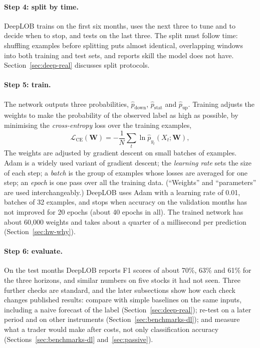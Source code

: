 \paragraph{Step 4: split by time.} DeepLOB trains on the first six months, uses the next three to tune and to decide
when to stop, and tests on the last three. The split must follow time: shuffling examples before splitting puts
almost identical, overlapping windows into both training and test sets, and reports skill the model does not have.
Section~\ref{sec:deep-real} discusses split protocols.

\paragraph{Step 5: train.} The network outputs three probabilities, $\hat p_{\text{down}}$, $\hat p_{\text{stat}}$ and
$\hat p_{\text{up}}$. Training adjusts the weights to make the probability of the observed label as high as
possible, by minimising the \emph{cross-entropy} loss over the training examples,
\begin{equation}
\mathcal{L}_{\text{CE}}(\mathbf{W}) = -\frac{1}{N}\sum_{t} \ln \hat p_{y_t}(X_t; \mathbf{W}),
\label{eq:deep-ce}
\end{equation}
The weights are adjusted by gradient descent on small batches of examples. Adam is a widely used variant of gradient
descent; the \emph{learning rate} sets the size of each step; a \emph{batch} is the group of examples whose losses are
averaged for one step; an \emph{epoch} is one pass over all the training data. (``Weights'' and ``parameters'' are used
interchangeably.) DeepLOB uses Adam with a learning rate of 0.01, batches of 32 examples, and stops when accuracy on
the validation months has not improved for 20 epochs (about 40 epochs in all). The trained network has about 60,000
weights and takes about a quarter of a millisecond per prediction (Section~\ref{sec:hw-why}).

\paragraph{Step 6: evaluate.} On the test months DeepLOB reports F1 scores of about 70\%, 63\% and 61\% for the three
horizons, and similar numbers on five stocks it had not seen. Three further checks are standard, and the later subsections show how each check changes published results: compare with simple
baselines on the same inputs, including a naive forecast of the label (Section~\ref{sec:deep-real}); re-test on a
later period and on other instruments (Section~\ref{sec:benchmarks-dl}); and measure what a trader would make
after costs, not only classification accuracy (Sections~\ref{sec:benchmarks-dl} and~\ref{sec:passive}).

